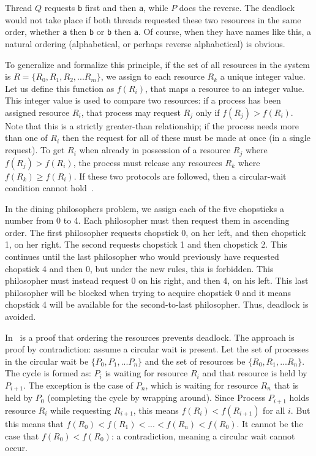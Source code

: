 Thread $Q$ requests \texttt{b} first and then \texttt{a}, while $P$ does the reverse. The deadlock would not take place if both threads requested these two resources in the same order, whether \texttt{a} then \texttt{b} or \texttt{b} then \texttt{a}. Of course, when they have names like this, a natural ordering (alphabetical, or perhaps reverse alphabetical) is obvious. 

To generalize and formalize this principle, if the set of all resources in the system is $R = \{R_{0}, R_{1}, R_{2}, ... R_{m}\}$, we assign to each resource $R_{k}$ a unique integer value. Let us define this function as $f(R_{i})$, that maps a resource to an integer value. This integer value is used to compare two resources: if a process has been assigned resource $R_{i}$, that process may request $R_{j}$ only if $f(R_{j}) > f(R_{i})$. Note that this is a strictly greater-than relationship; if the process needs more than one of $R_{i}$ then the request for all of these must be made at once (in a single request). To get $R_{i}$ when already in possession of a resource $R_{j}$ where $f(R_{j}) > f(R_{i})$, the process must release any resources $R_{k}$ where $f(R_{k}) \geq f(R_{i})$. If these two protocols are followed, then a circular-wait condition cannot hold~\cite{osc}.

In the dining philosophers problem, we assign each of the five chopsticks a number from 0 to 4. Each philosopher must then request them in ascending order. The first philosopher requests chopstick 0, on her left, and then chopstick 1, on her right. The second requests chopstick 1 and then chopstick 2. This continues until the last philosopher who would previously have requested chopstick 4 and then 0, but under the new rules, this is forbidden. This philosopher must instead request 0 on his right, and then 4, on his left. This last philosopher will be blocked when trying to acquire chopstick 0 and it means chopstick 4 will be available for the second-to-last philosopher. Thus, deadlock is avoided.

In~\cite{osc} is a proof that ordering the resources prevents deadlock. The approach is proof by contradiction: assume a circular wait is present. Let the set of processes in the circular wait be $\{P_{0}, P_{1}, ... P_{n}\}$ and the set of resources be $\{R_{0}, R_{1}, ... R_{n}\}$. The cycle is formed as: $P_{i}$ is waiting for resource $R_{i}$ and that resource is held by $P_{i+1}$. The exception is the case of $P_{n}$, which is waiting for resource $R_{n}$ that is held by $P_{0}$ (completing the cycle by wrapping around). Since Process $P_{i+1}$ holds resource $R_{i}$ while requesting $R_{i+1}$, this means $f(R_{i}) < f(R_{i+1})$ for all $i$. But this means that $f(R_{0}) < f(R_{1}) < ... < f(R_{n}) < f(R_{0})$. It cannot be the case that $f(R_{0}) < f(R_{0})$: a contradiction, meaning a circular wait cannot occur.

